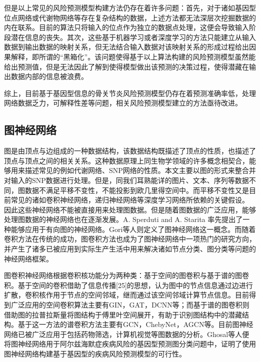 但是以上常见的风险预测模型构建方法仍存在着许多问题：首先，对于诸如基因型位点网络或代谢物网络等存在复杂结构的数据，上述方法都无法深层次挖掘数据的内在联系。目前的算法只将输入的位点作为独立的数据点处理，这便会导致输入阶段潜在信息的丧失。其次，这些基于机器学习或者深度学习的方法只能建立从输入数据到输出数据的映射关系，但无法结合输入数据对该映射关系的形成过程给出因果解释，即所谓的“黑箱化”。该问题使得基于以上算法构建的风险预测模型虽然能给出预测值，但是无法因此了解到使得模型做出该预测的决策过程，使得潜藏在输出数据内部的信息被浪费。

综上，目前基于基因型信息的骨关节炎风险预测模型仍存在着预测准确率低，处理网络数据乏力，可解释性差等问题，相关风险预测模型建立的方法亟待改进。
\subsection{图神经网络}
图是由顶点与边组成的一种数据结构，该数据结构既描述了顶点的性质，也描述了顶点与顶点之间的相关关系。这种数据原理上同生物学领域的许多概念相契合，能够用来描述常见的例如代谢网络、SNP网络的性质。本文主要以图的形式来整合并对输入的SNP数据进行处理。但是，同我们耳熟能详的图片、文本、序列等数据不同，图数据不满足平移不变性，不能投影到欧几里得空间中。而平移不变性又是目前常见的诸如卷积神经网络，递归神经网络等深度学习网络所依赖的关键假设。\cite{bronstein_geometric_2017} 因此这些神经网络不能被直接用来处理图数据。但是随着图数据的广泛应用，能够处理图数据的神经网络也在逐渐发展。A. Sperduti and A. Starita\cite{sperduti_supervised_1997} 率先提出了一种能够应用于有向图的神经网络。Gori\cite{gori_new_2005}等人则定义了图神经网络这一概念。而随着卷积方法在传统的成功，图卷积方法也成为了图神经网络中一项热门的研究方向，并产生了诸多已被应用到实际生产生活中用来解决诸如节点分类、图分类等问题的神经网络框架。

图卷积神经网络根据卷积核功能分为两种类：基于空间的图卷积与基于谱的图卷积。基于空间的卷积借助了信息传播[25]的思想，认为图中的节点信息通过边进行扩散，卷积核作用于节点的空间邻域，继而通过该空间邻域计算节点信息。目前得到广泛应用的空间卷积算法主要有GIN\cite{xu_how_2019}，GAT\cite{velickovic_graph_2018}，DCNN\cite{atwood_diffusion-convolutional_2016}等；而基于谱的图卷积则借助图的拉普拉斯量将图结构于傅里叶空间展开，有助于识别图结构中的潜藏结构。基于这一方法的谱卷积方法主要有GCN\cite{kipf_semi-supervised_2017}，ChebyNet\cite{defferrard_convolutional_2017}，AGCN\cite{li_adaptive_2018}等。目前图神经网络已被广泛应用于包括药物筛选\cite{veselkov_hyperfoods:_2019,knyazev_spectral_2018}，计算机视觉\cite{yan_spatial_2018}等图数据的分析。Ghosal\cite{ghosal_biologically_2021}等人便将图神经网络用于阿尔兹海默症疾病风险的基因型预测图分类问题中，证明了使用图神经网络构建基于基因型的疾病风险预测模型的可行性。

